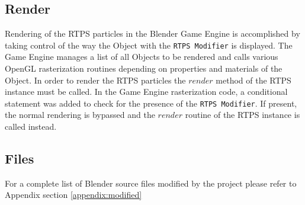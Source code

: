 \subsection{Render}
Rendering of the RTPS particles in the Blender Game Engine is accomplished by
taking control of the way the Object with the \verb|RTPS Modifier| is displayed. The
Game Engine manages a list of all Objects to be rendered and calls various
OpenGL rasterization routines depending on properties and materials of the
Object. In order to render the RTPS particles the $render$ method of the RTPS
instance must be called. In the Game Engine rasterization code, a conditional
statement was added to check for the presence of the \verb|RTPS Modifier|. If
present, the normal rendering is bypassed and the $render$ routine of the RTPS
instance is called instead.

\subsection{Files}
For a complete list of Blender source files modified by the project please
refer to Appendix section \ref{appendix:modified} 


